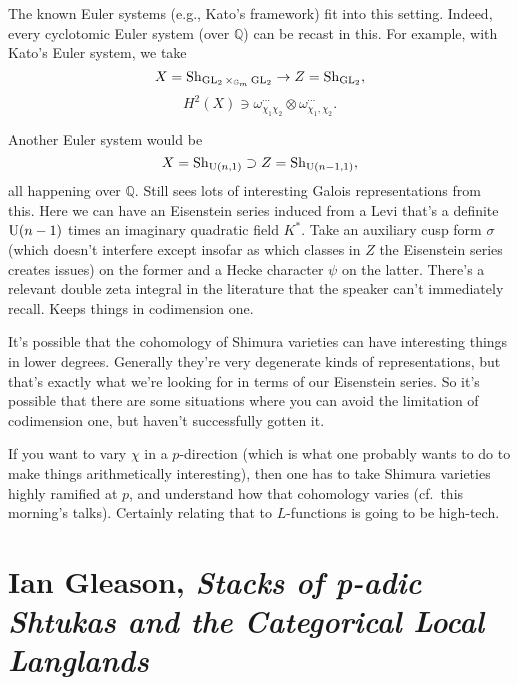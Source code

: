 \documentclass[reqno]{amsart} 
\begin{document}
\begin{remark}
  The known Euler systems (e.g., Kato's framework) fit into this setting.  Indeed, every cyclotomic Euler system (over $\mathbb{Q}$) can be recast in this.  For example, with Kato's Euler system, we take
  \begin{equation*}
    X = \mathrm{Sh}_{\operatorname{GL}_2 \times_{\mathbb{G}_m} \operatorname{GL}_2 }
    \rightarrow Z = \mathrm{Sh}_{\operatorname{GL}_2},
  \end{equation*}
  \begin{equation*}
    H^2(X) \ni \omega_{\chi_1 \chi_2}^{\dotsb} \otimes \omega_{\chi_1, \chi_2}^{\dotsb}.
  \end{equation*}

  Another Euler system would be
  \begin{equation*}
    X = \mathrm{Sh}_{\operatorname{U}(n, 1)} \supset Z = \mathrm{Sh}_{\operatorname{U}(n - 1, 1)},
  \end{equation*}
  all happening over $\mathbb{Q}$.  Still sees lots of interesting Galois representations from this.  Here we can have an Eisenstein series induced from a Levi that's a definite $\operatorname{U}(n-1)$ times an imaginary quadratic field $K^\ast$.  Take an auxiliary cusp form $\sigma$ (which doesn't interfere except insofar as which classes in $Z$ the Eisenstein series creates issues) on the former and a Hecke character $\psi$ on the latter.  There's a relevant double zeta integral in the literature that the speaker can't immediately recall.  Keeps things in codimension one.

  It's possible that the cohomology of Shimura varieties can have interesting things in lower degrees.  Generally they're very degenerate kinds of representations, but that's exactly what we're looking for in terms of our Eisenstein series.  So it's possible that there are some situations where you can avoid the limitation of codimension one, but haven't successfully gotten it.
\end{remark}

\begin{remark}
  If you want to vary $\chi$ in a $p$-direction (which is what one probably wants to do to make things arithmetically interesting), then one has to take Shimura varieties highly ramified at $p$, and understand how that cohomology varies (cf.\ this morning's talks).  Certainly relating that to $L$-functions is going to be high-tech.
\end{remark}

\part{Ian Gleason, \emph{Stacks of p-adic Shtukas and the Categorical Local Langlands}}
\end{document}
